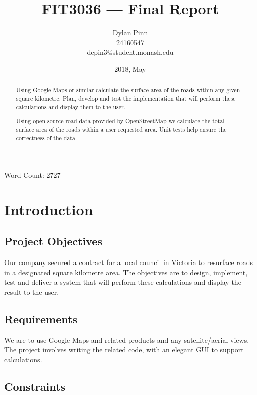 \documentclass[a4paper,11pt]{article}
\title{FIT3036 --- Final Report}
\author{Dylan Pinn \\ 24160547 \\ dcpin3@student.monash.edu}
\date{2018, May}
\begin{document}
\maketitle
\vspace{-2ex}
\begin{center}
  Word Count: 2727
\end{center}

\begin{abstract}
  Using Google Maps or similar calculate the surface area of the roads within
  any given square kilometre. Plan, develop and test the implementation that
  will perform these calculations and display them to the user.

  Using open source road data provided by OpenStreetMap we calculate the total
  surface area of the roads within a user requested area. Unit tests help ensure
  the correctness of the data.
\end{abstract}

\pagebreak

\tableofcontents
\pagebreak

\section{Introduction}

\subsection{Project Objectives}

Our company secured a contract for a local council in Victoria to resurface
roads in a designated square kilometre area. The objectives are to design,
implement, test and deliver a system that will perform these calculations and
display the result to the user.

\subsection{Requirements}

We are to use Google Maps and related products and any satellite/aerial views.
The project involves writing the related code, with an elegant GUI to support
calculations. \autocite[2]{intro:1}

\subsection{Constraints}
\end{document}
